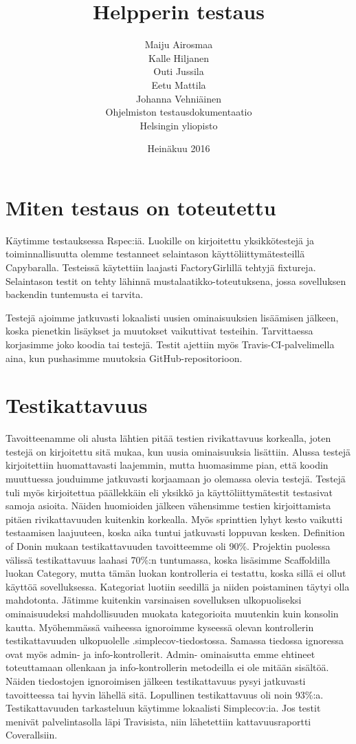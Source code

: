 \documentclass[a4paper,12pt, titlepage]{article}
\title{Helpperin testaus}
\author{ Maiju Airosmaa \\ Kalle Hiljanen \\
Outi Jussila \\ Eetu Mattila \\ Johanna Vehniäinen \\[1cm] Ohjelmiston testausdokumentaatio \\ Helsingin yliopisto}
\date{Heinäkuu 2016}
\begin{document}
\maketitle

\newpage
\tableofcontents
\newpage

\section{Miten testaus on toteutettu}

Käytimme testauksessa Rspec:iä. Luokille on kirjoitettu yksikkötestejä ja toiminnallisuutta olemme testanneet selaintason käyttöliittymätesteillä Capybaralla. Testeissä käytettiin laajasti FactoryGirlillä tehtyjä fixtureja. Selaintason testit on tehty lähinnä mustalaatikko-toteutuksena, jossa sovelluksen backendin tuntemusta ei tarvita.

Testejä ajoimme jatkuvasti lokaalisti uusien ominaisuuksien lisäämisen jälkeen, koska pienetkin lisäykset ja muutokset vaikuttivat testeihin. Tarvittaessa korjasimme joko koodia tai testejä. Testit ajettiin myös Travis-CI-palvelimella aina, kun pushasimme muutoksia GitHub-repositorioon.

\section{Testikattavuus}

Tavoitteenamme oli alusta lähtien pitää testien rivikattavuus korkealla, joten testejä on kirjoitettu sitä mukaa, kun uusia ominaisuuksia lisättiin. Alussa testejä kirjoitettiin huomattavasti laajemmin, mutta huomasimme pian, että koodin muuttuessa jouduimme jatkuvasti korjaamaan jo olemassa olevia testejä. Testejä tuli myös kirjoitettua päällekkäin eli yksikkö ja käyttöliittymätestit testasivat samoja asioita. Näiden huomioiden jälkeen vähensimme testien kirjoittamista pitäen rivikattavuuden kuitenkin korkealla. Myös sprinttien lyhyt kesto vaikutti testaamisen laajuuteen, koska aika tuntui jatkuvasti loppuvan kesken. Definition of Donin mukaan testikattavuuden tavoitteemme oli 90\%. Projektin puolessa välissä testikattavuus laahasi 70\%:n tuntumassa, koska lisäsimme Scaffoldilla luokan Category, mutta tämän luokan kontrolleria ei testattu, koska sillä ei ollut käyttöä sovelluksessa. Kategoriat luotiin seedillä ja niiden poistaminen täytyi olla mahdotonta. Jätimme kuitenkin varsinaisen sovelluksen ulkopuoliseksi ominaisuudeksi mahdollisuuden muokata kategorioita muutenkin kuin konsolin kautta. Myöhemmässä vaiheessa ignoroimme kyseessä olevan kontrollerin testikattavuuden ulkopuolelle .simplecov-tiedostossa. Samassa tiedossa ignoressa ovat myös admin- ja info-kontrollerit. Admin- ominaisutta emme ehtineet toteuttamaan ollenkaan ja info-kontrollerin metodeilla ei ole mitään sisältöä. Näiden tiedostojen ignoroimisen jälkeen testikattavuus pysyi jatkuvasti tavoitteessa tai hyvin lähellä sitä. Lopullinen testikattavuus oli noin 93\%:a.
Testikattavuuden tarkasteluun käytimme lokaalisti Simplecov:ia. Jos testit menivät palvelintasolla läpi Travisista, niin lähetettiin kattavuusraportti Coverallsiin.
\end{document}
